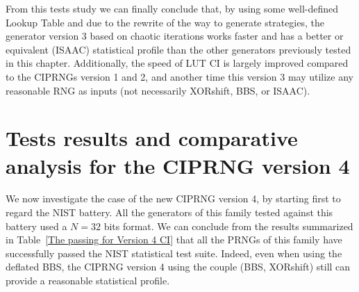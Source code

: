 From this tests study we can finally conclude that,
by using some well-defined Lookup Table and due to the rewrite of the way to generate strategies, 
the generator version 3 based on chaotic iterations works faster and has a better or equivalent (ISAAC) statistical profile than the
other generators previously tested in this chapter. Additionally, the speed of LUT CI is largely improved compared to 
the CIPRNGs version 1 and 2, and another time this version 3 may utilize any 
reasonable RNG as inputs (not necessarily XORshift, BBS, or ISAAC). 



\section{Tests results and comparative analysis for the CIPRNG version 4}
\label{test for Version 4 CI}
\label{Results of NIST for Version 4 CI}

We now investigate the case of the new
CIPRNG version 4, by starting first
to regard the NIST battery.
All the generators of this family tested
against this battery used a
$N = 32$ bits format. 
We can conclude from the results
summarized in Table~\ref{The passing for Version 4 CI} 
that all the PRNGs of this family have successfully passed the NIST statistical test suite. 
Indeed, even when using the deflated BBS, 
the CIPRNG version 4 using the couple (BBS, XORshift) still can provide a reasonable
statistical profile.

